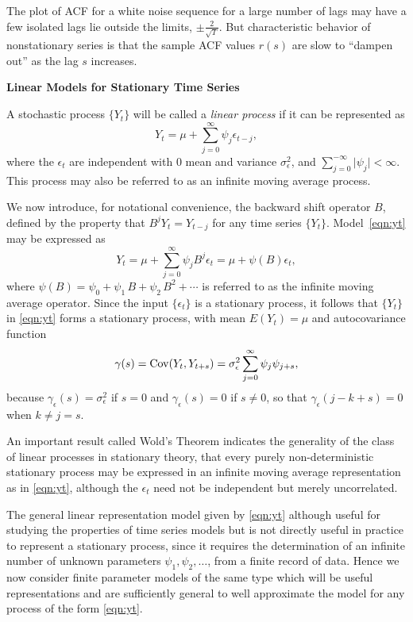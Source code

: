 The plot of ACF for a white noise sequence for a large number of lags may have a few isolated lags lie outside the limits, $\pm \frac{2}{\sqrt{T}}$. But characteristic behavior of nonstationary series is that the sample ACF values $r(s)$ are slow to ``dampen out'' as the lag $s$ increases. \twomedskip


\noindent\textbf{Linear Models for Stationary Time Series} \twomedskip


A stochastic process $\{ Y_t \}$ will be called a \emph{linear process} if it can be represented as
	\begin{equation} \label{eqn:yt}
          Y_t = \mu + \sum_{j=0}^{\infty}  \psi_j \epsilon_{t-j},
	\end{equation}
where the $\epsilon_t$ are independent with 0 mean and variance $\sigma^2_{\epsilon}$, and $\sum_{j=0}^{-\infty} \lvert \psi_j \rvert < \infty$. This process may also be referred to as an infinite moving average process.


We now introduce, for notational convenience, the backward shift operator $B$, defined by the property that $B^j Y_t = Y_{t-j}$ for any time series $\{ Y_t \}$. Model~\eqref{eqn:yt} may be expressed as
	\[
	Y_t = \mu + \sum_{j=0}^{\infty} \psi_j B^j \epsilon_t = \mu + \psi(B) \epsilon_t,
	\]
where $\psi(B) = \psi_0 + \psi_1 \, B + \psi_2 \, B^2 + \cdots$ is referred to as the infinite moving average operator. Since the input $\{\epsilon_t\}$ is a stationary process, it follows that $\{ Y_t \}$ in \eqref{eqn:yt} forms a stationary process, with mean $E(Y_t)=\mu$ and autocovariance function
	\begin{equation} \label{eqn:covyt}
	\gamma(s)= \cov(Y_t, Y_{t+s})= \sigma^2_{\epsilon} \sum_{j=0}^{\infty} \psi_j \psi_{j+s},
	\end{equation}      
because $\gamma_\epsilon(s) = \sigma^2_\epsilon$ if $s=0$ and $\gamma_\epsilon(s) = 0$ if $s \neq 0$, so that $\gamma_\epsilon(j - k + s) = 0$ when $k \neq j = s$.
	

An important result called Wold's Theorem indicates the generality of the class of linear processes in stationary theory, that every purely non-deterministic stationary process may be expressed in an infinite moving average representation as in \eqref{eqn:yt}, although the $\epsilon_t$ need not be independent but merely uncorrelated.	


The general linear representation model given by \eqref{eqn:yt} although useful for studying the properties of time series models but is not directly useful in practice to represent a stationary process, since it requires the determination of an infinite number of unknown parameters $\psi_1, \psi_2, \ldots$, from a finite record of data. Hence we now consider finite parameter models of the same type which will be useful representations and are sufficiently general to well approximate the model for any process of the form \eqref{eqn:yt}. \twomedskip


